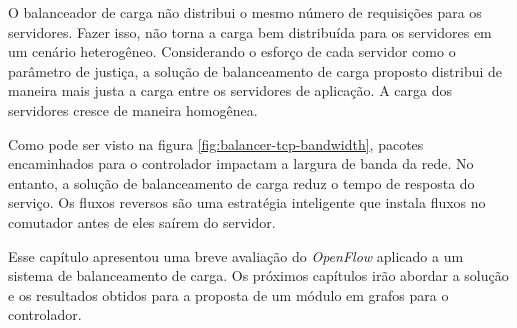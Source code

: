 O balanceador de carga não distribui o mesmo número de requisições para 
os servidores.
Fazer isso, não torna a carga bem distribuída para os servidores em um 
cenário heterogêneo. 
Considerando o esforço de cada servidor como o parâmetro de justiça, a solução
de balanceamento de carga proposto distribui de maneira mais justa a carga 
entre os servidores de aplicação.
A carga dos servidores cresce de maneira homogênea.

Como pode ser visto na figura \ref{fig:balancer-tcp-bandwidth}, pacotes 
encaminhados para o controlador impactam a largura de banda da rede.
No entanto, a solução de balanceamento de carga reduz o tempo de resposta 
do serviço. 
Os fluxos reversos são uma estratégia inteligente que instala fluxos no 
comutador antes de eles saírem do servidor.

Esse capítulo apresentou uma breve avaliação do \emph{OpenFlow} aplicado 
a um sistema de balanceamento de carga.
Os próximos capítulos irão abordar a solução e os resultados obtidos para
a proposta de um módulo em grafos para o controlador.
